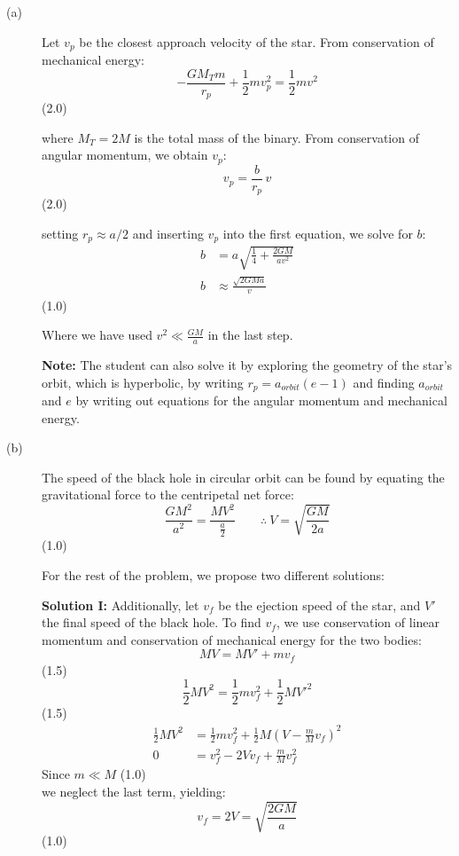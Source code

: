 \begin{description}
\item[(a)] Let $v_p$ be the closest approach velocity of the star. From
  conservation of mechanical energy:
  \[ -\frac{G M_T m}{r_p} + \frac{1}{2} m v_p^2 = \frac{1}{2} m v^2 \]
  \hfill(2.0)

  where $M_T = 2M$ is the total mass of the binary. From conservation of
  angular momentum, we obtain $v_p$:
  \[ v_p = \frac{b}{r_p}\,v \]
  \hfill(2.0)

  setting $r_p \approx a/2$ and inserting $v_p$ into the first equation, we
  solve for $b$:
  \begin{align*}
    b &= a\sqrt{\frac{1}{4} + \frac{2GM}{a v^2}} \\
    b &\approx \frac{\sqrt{2GMa}}{v}
  \end{align*}
  \hfill(1.0)

  Where we have used $v^2 \ll \frac{GM}{a}$ in the last step.

  \textbf{Note:} The student can also solve it by exploring the geometry of
  the star's orbit, which is hyperbolic, by writing
  $r_p = a_{orbit}(e - 1)$ and finding $a_{orbit}$ and $e$ by writing out
  equations for the angular momentum and mechanical energy.

\item[(b)] The speed of the black hole in circular orbit can be found by
  equating the gravitational force to the centripetal net force:
  \[ \frac{GM^2}{a^2} = \frac{M V^2}{\frac{a}{2}}
     \qquad \therefore\ V = \sqrt{\frac{GM}{2a}} \]
  \hfill(1.0)

  For the rest of the problem, we propose two different solutions:

  \textbf{Solution I:}
  Additionally, let $v_f$ be the ejection speed of the star, and $V'$ the
  final speed of the black hole. To find $v_f$, we use conservation of linear
  momentum and conservation of mechanical energy for the two bodies:
  \[ M V = M V' + m v_f \]
  \hfill(1.5)
  \[ \frac{1}{2} M V^2 = \frac{1}{2} m v_f^2 + \frac{1}{2} M V'^2 \]
  \hfill(1.5)
  \begin{align*}
    \frac{1}{2} M V^2
      &= \frac{1}{2} m v_f^2
       + \frac{1}{2} M \left( V - \frac{m}{M} v_f \right)^2 \\
    0 &= v_f^2 - 2 V v_f + \frac{m}{M} v_f^2
  \end{align*}
  Since $m \ll M$ \hfill(1.0)\\
  we neglect the last term, yielding:
  \[ v_f = 2V = \sqrt{\frac{2GM}{a}} \]
  \hfill(1.0)


\end{description}

